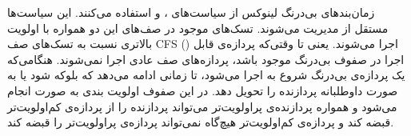 زمان‌بندهای بی‌درنگ لینوکس از سیاست‌های
،
و
استفاده می‌کنند. این سیاست‌ها مستقل از
مدیریت می‌شوند. تسک‌های موجود در صف‌های این دو همواره با اولویت بالاتری نسبت به تسک‌های صف CFS
()
اجرا می‌شوند. یعنی تا وقتی‌که پردازه‌ی قابل اجرا در صفوف بی‌درنگ موجود باشد، پردازه‌های صف عادی اجرا نمی‌شوند. هنگامی‌که یک پردازه‌ی بی‌درنگ شروع به اجرا می‌شود، تا زمانی ادامه می‌دهد که بلوکه شود یا به صورت داوطلبانه پردازنده را تحویل دهد. در این صفوف اولویت بندی به صورت
انجام می‌شود و همواره پردازنده‌ی پراولویت‌تر می‌تواند پردازنده را از پردازه‌ی کم‌اولویت‌تر قبضه کند و پردازه‌ی کم‌اولویت‌تر هیچ‌گاه نمی‌تواند پردازه‌ی پراولویت‌تر را قبضه کند.